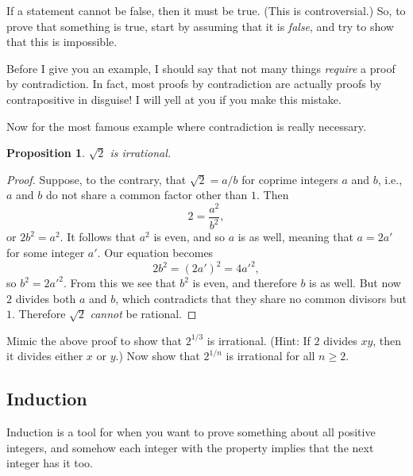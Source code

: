 \documentclass[12pt]{article}
\newtheorem{proposition}{Proposition}
\theoremstyle{definition}
\begin{document}
If a statement cannot be false, then it must be true. (This is controversial.)
So, to prove that something is true, start by assuming that it is \emph{false},
and try to show that this is impossible.

Before I give you an example, I should say that not many things \emph{require}
a proof by contradiction. In fact, most proofs by contradiction are actually
proofs by contrapositive in disguise! I will yell at you if you make this
mistake.

Now for the most famous example where contradiction is really necessary.

\begin{proposition}
    $\sqrt{2}$ is irrational.
\end{proposition}

\begin{proof}
    Suppose, to the contrary, that $\sqrt{2} = a / b$ for coprime integers $a$
    and $b$, i.e., $a$ and $b$ do not share a common factor other than $1$.
    Then
    \begin{equation*}
        2 = \frac{a^2}{b^2},
    \end{equation*}
    or $2 b^2 = a^2$. It follows that $a^2$ is even, and so $a$ is as well,
    meaning that $a = 2a'$ for some integer $a'$. Our equation becomes
    \begin{equation*}
        2 b^2 = (2a')^2 = 4a'^2,
    \end{equation*}
    so $b^2 = 2a'^2$. From this we see that $b^2$ is even, and therefore $b$ is
    as well. But now $2$ divides both $a$ and $b$, which contradicts that they
    share no common divisors but $1$. Therefore $\sqrt{2}$ \emph{cannot} be
    rational.
\end{proof}

\begin{Exercise}
    Mimic the above proof to show that $2^{1/3}$ is irrational. (Hint: If $2$
    divides $xy$, then it divides either $x$ or $y$.) Now show that $2^{1/n}$
    is irrational for all $n \geq 2$.
\end{Exercise}

\subsection*{Induction}

Induction is a tool for when you want to prove something about all positive
integers, and somehow each integer with the property implies that the next
integer has it too.
\end{document}
